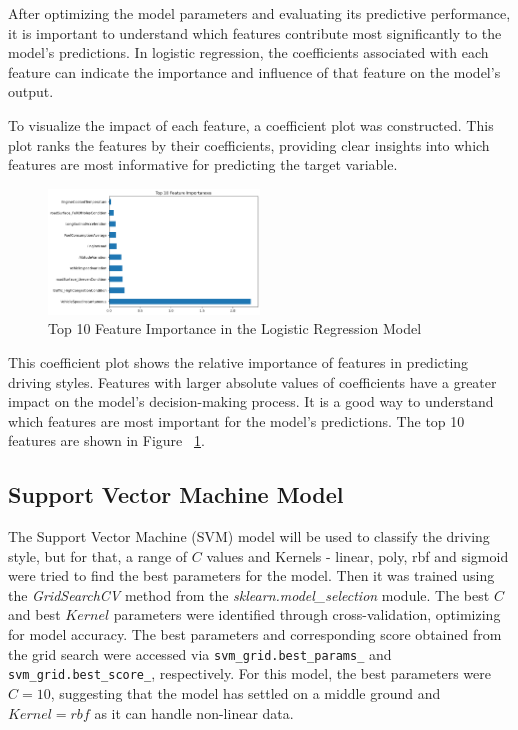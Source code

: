 \documentclass[10pt,journal,compsoc]{IEEEtran}
\begin{document}
After optimizing the model parameters and evaluating its predictive performance, it is important to understand which features contribute most significantly to the model's predictions. 
In logistic regression, the coefficients associated with each feature can indicate the importance and influence of that feature on the model's output. 

To visualize the impact of each feature, a coefficient plot was constructed. This plot ranks the features by their coefficients, providing clear insights into which features are 
most informative for predicting the target variable.

\begin{figure}[h]
    \centering
    \includegraphics[width=0.5\textwidth]{images/feature_importance.png} 
    \caption{Top 10 Feature Importance in the Logistic Regression Model}
    \label{fig:feature_importances}
\end{figure}

This coefficient plot shows the relative importance of features in predicting driving styles. Features with larger absolute values of coefficients have a greater impact on the model's 
decision-making process. It is a good way to understand which features are most important for the model's predictions. The top 10 features are shown in Figure ~\ref{fig:feature_importances}.


\subsection{Support Vector Machine Model}
The Support Vector Machine (SVM) model will be used to classify the driving style, but for that, a range of $C$ values and Kernels - linear, poly, rbf and sigmoid were tried to 
find the best parameters for the model. Then it was trained using the \textit{GridSearchCV} method from the \textit{sklearn.model\_selection} module. The best $C$ and best $Kernel$ parameters were identified through cross-validation, optimizing for model accuracy. 
The best parameters and corresponding score obtained from the grid search were accessed via \texttt{svm\_grid.best\_params\_} and \texttt{svm\_grid.best\_score\_}, respectively. For this model, the best parameters were $C=10$, 
suggesting that the model has settled on a middle ground and $Kernel=rbf$ as it can handle non-linear data.
\end{document}
